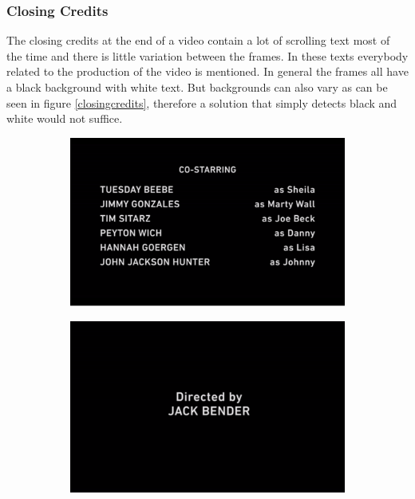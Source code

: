 \documentclass{article}
\begin{document}
\subsubsection{Closing Credits}
The closing credits at the end of a video contain a lot of scrolling text most of the time and there is little variation between the frames. In these texts everybody related to the production of the video is mentioned. In general the frames all have a black background with white text. But backgrounds can also vary as can be seen in figure \ref{closingcredits}, therefore a solution that simply detects black and white would not suffice.

\begin{figure}[H]
  \centering
  \begin{subfigure}[b]{0.4\textwidth}
    \includegraphics[width=\textwidth]{images/screencreditslarge.png}
  \end{subfigure}
  \begin{subfigure}[b]{0.4\textwidth}
    \includegraphics[width=\textwidth]{images/screencreditslarge2.png}

\end{subfigure}
\end{figure}
\end{document}
